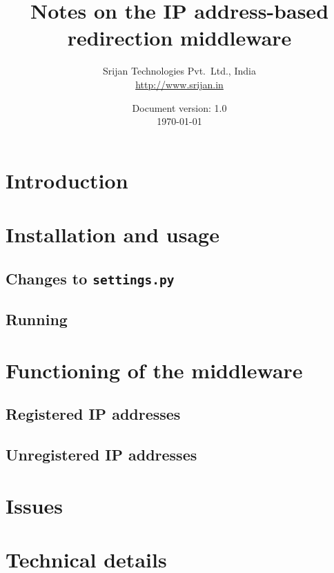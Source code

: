 \documentclass[a4paper]{report}
\newcommand{\revnum}{1.0\xspace}
\newcommand{\settings}{{\tt settings.py}\xspace}
\begin{document}
\begin{titlepage}
  \title{Notes on the IP address-based redirection middleware}
  \author{Srijan Technologies Pvt.~Ltd., India\\\url{http://www.srijan.in}}
  \date{Document version: \revnum\\ \today}
  \maketitle
\end{titlepage}

\setcounter{tocdepth}{2}
\tableofcontents

\setcounter{page}{1}

\chapter{Introduction}


\chapter{Installation and usage}
%
  \section{Changes to \settings}
  \section{Running}

\chapter{Functioning of the middleware}
%
  \section{Registered IP addresses}
  \section{Unregistered IP addresses}

\chapter{Issues}
%

\chapter{Technical details}
% 


\end{document}

